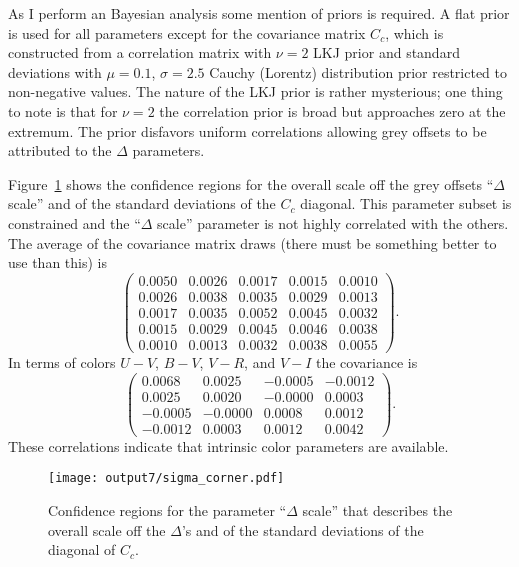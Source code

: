 \documentclass[11pt, oneside]{article}   	%
\begin{document}
As I perform an Bayesian analysis some mention of priors is required.  A flat prior is used for all parameters except
for the covariance matrix $C_c$, which is constructed from a correlation matrix with  $\nu=2$  LKJ prior and standard
deviations with
 $\mu=0.1$, $\sigma=2.5$ Cauchy (Lorentz) distribution prior restricted to non-negative values.
The nature of the LKJ prior is rather mysterious; one thing to note is that for $\nu=2$ the correlation prior is broad but
approaches zero at the extremum.  The prior disfavors uniform correlations allowing grey offsets to be attributed to the $\Delta$ parameters.

Figure~\ref{sigma:fig} shows the confidence regions for 
 the overall scale off the grey offsets
 ``$\Delta$ scale''
and of the standard deviations of the $C_c$ diagonal.  This parameter subset is constrained and the  ``$\Delta$ scale'' parameter
is not highly correlated with the others.  The average
of the covariance matrix draws (there must be something better to use than this) is 
\begin{equation}
\begin{pmatrix}
0.0050 & 0.0026 & 0.0017 & 0.0015 & 0.0010 \\
0.0026 & 0.0038 & 0.0035 & 0.0029 & 0.0013 \\
0.0017 & 0.0035 & 0.0052 & 0.0045 & 0.0032 \\
0.0015 & 0.0029 & 0.0045 & 0.0046 & 0.0038 \\
0.0010 & 0.0013 & 0.0032 & 0.0038 & 0.0055
 \end{pmatrix}.
 \end{equation}
 In terms of colors $U-V$, $B-V$, $V-R$, and $V-I$ the covariance is
\begin{equation}
\begin{pmatrix}
 0.0068 & 0.0025 & -0.0005 & -0.0012 \\
0.0025 & 0.0020 & -0.0000 & 0.0003 \\
-0.0005 & -0.0000 & 0.0008 & 0.0012 \\
-0.0012 & 0.0003 & 0.0012 & 0.0042
  \end{pmatrix}.
 \end{equation}
These correlations indicate that intrinsic color parameters are available. 
  
\begin{figure}[htbp] %
   \centering
   \texttt{[image: output7/sigma\_corner.pdf]} 
   \caption{Confidence regions for the parameter ``$\Delta$ scale'' that describes the overall scale off the $\Delta$'s
and of the standard deviations of the diagonal of $C_c$.}
   \label{sigma:fig}
\end{figure}
\end{document}
